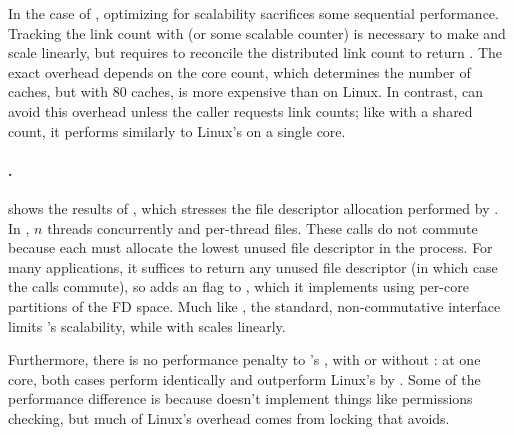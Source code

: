 In the case of , optimizing for scalability sacrifices some
sequential performance.  Tracking the link count with 
(or some scalable counter) is necessary to make  and
 scale linearly, but requires  to reconcile the
distributed link count to return .  The exact overhead
depends on the core count, which determines the number of 
caches, but with 80  caches,  is 
more expensive than on Linux.  
%
In contrast,  can avoid this overhead unless the caller
requests link counts; like  with a shared count, it
performs similarly to Linux's  on a single core.

\paragraph{.}  shows the results
of , which stresses the file descriptor allocation performed by
.  In , $n$ threads concurrently  and
 per-thread files.  These calls do not commute because each
 must allocate the lowest unused file
descriptor in the process.  For many applications, it suffices to return
any unused file descriptor (in which case the  calls commute),
so \sys adds an  flag to , which it implements
using per-core partitions of the FD space.  Much like
, the standard, non-commutative  interface limits
's scalability, while  with  scales
linearly.

Furthermore, there is no performance penalty to
\fs's , with or without : at one core, both
cases perform identically and outperform Linux's  by
.
Some of the performance difference is because \sys doesn't implement things like
permissions checking, but much of Linux's overhead comes from locking
that \fs avoids.

